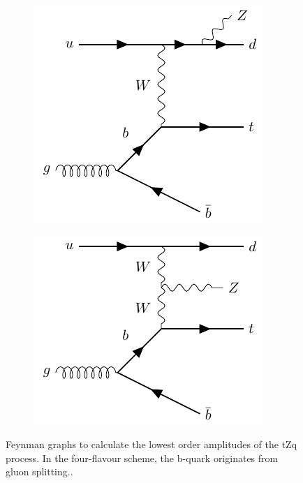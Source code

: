 \begin{figure}[h!]
\begin{subfigure}[b]{0.33\linewidth}
  \caption{}
  \end{subfigure}%
  \newline
  \begin{subfigure}[b]{0.33\linewidth}
    \centering
    \includegraphics[width=0.7\linewidth]{ubonn-thesis/Chapters/Chapters_02/Figure/tZq_Zfromd.pdf} 
  \caption{}
  \end{subfigure}%
  \begin{subfigure}[b]{0.33\linewidth}
    \centering
    \includegraphics[width=0.7\linewidth]{ubonn-thesis/Chapters/Chapters_02/Figure/tZq_ZfromWW.pdf} 
  \caption{}
  \label{wwzcoup}
  \end{subfigure}
  \caption{Feynman graphs to calculate the lowest order amplitudes of the tZq process. In the four-flavour scheme, the b-quark originates from gluon splitting..}
  \label{fig:tZQ}
  \end{figure}